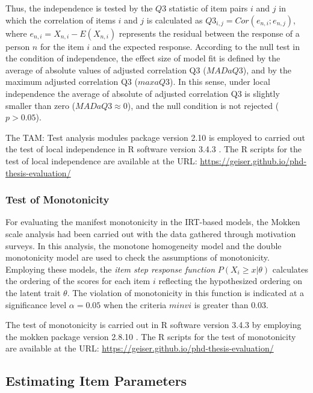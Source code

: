 Thus, the independence is tested by the $Q3$ statistic of item pairs $i$ and $j$ in which the correlation of items $i$ and $j$ is calculated as $Q3_{i,j} = Cor(e_{n,i}; e_{n,j})$, where $e_{n,i} = X_{n,i} - E(X_{n,i})$ represents the residual between the response of a person $n$ for the item $i$ and the expected response. According to the null test in the condition of independence, the effect size of model fit is defined by the average of absolute values of adjusted correlation Q3 ($MADaQ3$), and by the maximum adjusted correlation Q3 ($maxaQ3$). In this sense, under local independence the average of absolute of adjusted correlation Q3 is slightly smaller than zero ($MADaQ3 \approx 0$), and the null condition is not rejected ($p > 0.05$).

The TAM: Test analysis modules package version 2.10 \cite{RobitzschKieferWu2018} is employed to carried out the test of local independence in R software version 3.4.3 \cite{RCoreTeam2017}. The R scripts for the test of local independence are available at the URL: \url{https://geiser.github.io/phd-thesis-evaluation/}

\subsubsection*{Test of Monotonicity}

For evaluating the manifest monotonicity in the IRT-based models, the Mokken scale analysis \cite{Mokken1971, VanderArk2007} had been carried out with the data gathered through motivation surveys. In this analysis, the monotone homogeneity model and the double monotonicity model are used to check the assumptions of monotonicity. Employing these models, the \emph{item step response function} $P(X_{i} \geq x | \theta)$ calculates the ordering of the scores for each item $i$ reflecting the hypothesized ordering on the latent trait $\theta$. The violation of monotonicity in this function  is indicated at a significance level $\alpha = 0.05$ when the criteria $minvi$ is greater than $0.03$.

The test of monotonicity is carried out in R software version 3.4.3 \cite{RCoreTeam2017} by employing the mokken package version 2.8.10 \cite{VanderArk2012,VanderArk2007}. The R scripts for the test of monotonicity are available at the URL: \url{https://geiser.github.io/phd-thesis-evaluation/}

\subsection{Estimating Item Parameters}
\label{sec:estimating-parameters-irt-motivation}

